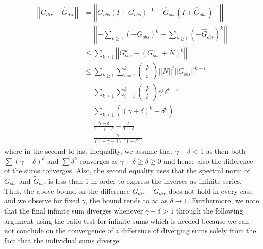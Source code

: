 \documentclass[../Thesis.tex]{subfiles}
\begin{document}
\begin{equation}\label{eq:original noise error bound}
    \begin{split}
        \left|\left| G_{dir} - \hat{G}_{dir} \right|\right| & = \left|\left| G_{obs} \left(I + G_{obs}\right)^{-1} - \hat{G}_{obs}\left(I+\hat{G}_{obs}\right)^{-1}\right|\right|                            \\
                                                            & = \left|\left| - \sum_{k\geq 1} \left( - G_{obs}\right)^k  +  \sum_{k\geq 1} \left(-\hat{G}_{obs}\right)^k \right|\right|                      \\
                                                            & \leq \sum_{k\geq 1} \left|\left|  G_{obs}^k  -  \left(G_{obs} + N\right)^k \right|\right|                                                      \\
                                                            & \leq \sum_{k \geq 1} \sum_{i=1}^{k} \begin{pmatrix}k\\i\end{pmatrix} \left|\left| N \right|\right|^i \left|\left| G_{obs} \right|\right|^{k-i} \\
                                                            & = \sum_{k \geq 1} \sum_{i=1}^{k} \begin{pmatrix}k\\i\end{pmatrix} \gamma ^i \delta^{k-i}                                                       \\
                                                            & = \sum_{k\geq 1} \left( \left( \gamma + \delta\right)^k - \delta^k \right)                                                                     \\
                                                            & = \frac{\gamma + \delta}{1 - \gamma - \delta} - \frac{\delta}{1 - \delta}                                                                      \\
                                                            & = \frac{\gamma}{(1-\gamma - \delta)(1-\delta)}
    \end{split}
\end{equation}
where in the second to last inequality, we assume that $\gamma + \delta < 1$ as then both $\sum \left(\gamma + \delta\right)^k$ and $\sum \delta^k$ converges as $\gamma + \delta \geq \delta \geq 0$ and hence also the difference of the sums converges. Also, the second equality uses that the spectral norm of $G_{obs}$ and $\tilde{G}_{obs}$ is less than $1$ in order to express the inverses as infinite series. Thus, the above bound on the difference $G_{dir} - \tilde{G}_{dir}$ does not hold in every case and we observe for fixed $\gamma$, the bound tends to $\infty$ as $\delta \to 1$. Furthermore, we note that the final infinite sum diverges whenever $\gamma + \delta > 1$ through the following argument using the ratio test for infinite sums which is needed because we can not conclude on the convergence of a difference of diverging sums solely from the fact that the individual sums diverge:
\end{document}
